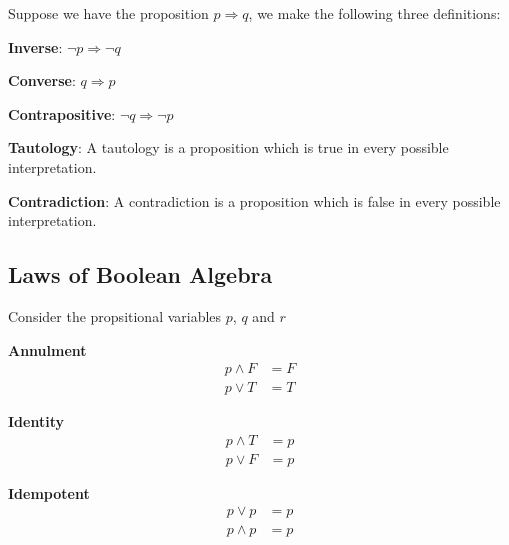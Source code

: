\newpage
\noindent Suppose we have the proposition $p \Rightarrow q$, we make the following three definitions:
\begin{defn}\label{mod1:defn:Inverse}
	\textbf{Inverse}: $\lnot p \Rightarrow \lnot q$ 
\end{defn}

\begin{defn}\label{mod1:defn:Converse}
	\textbf{Converse}: $q \Rightarrow p$ 
\end{defn}

\begin{defn}\label{mod1:defn:Contrapositive}
	\textbf{Contrapositive}: $\lnot q \Rightarrow \lnot p$ 
\end{defn}

\begin{defn}\label{mod1:defnTautology}
	\textbf{Tautology}: A tautology is a proposition which is true in every possible interpretation.
\end{defn}

\begin{defn}\label{mod1:defnContradiction}
	\textbf{Contradiction}: A contradiction is a proposition which is false in every possible interpretation.
\end{defn}





\subsection{Laws of Boolean Algebra}\label{BooleanAlgebraLaws}



\noindent Consider the propsitional variables $p$, $q$ and $r$


\begin{law}\label{mod1:law:Annulment}
	\textbf{Annulment}
	\begin{align}
	p \land F &= F  \\
	p \lor T &= T 
	\end{align}
\end{law}


\begin{law}\label{mod1:law:Identity}
	\textbf{Identity}
	\begin{align}
	p \land T &= p  \\
	p \lor F &= p
	\end{align}
\end{law}

\begin{law}\label{mod1:law:Idempotent}
	\textbf{Idempotent}
	\begin{align}
	p \lor p &= p\\
	p \land p &= p
	\end{align}
\end{law}

